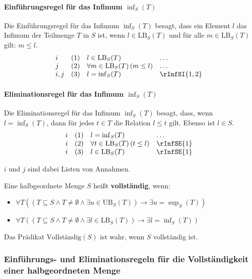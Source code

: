 \documentclass[main.tex]{subfiles}
\begin{document}
\paragraph{Einführungsregel für das Infimum \(\inf_S(T)\)}
Die Einführungsregel für das Infimum \(\inf_S(T)\) besagt, dass ein Element \( l \) das Infimum der Teilmenge \( T \) in \( S \) ist, wenn \( l \in \text{LB}_S(T) \) und für alle \( m \in \text{LB}_S(T) \) gilt: \( m \leq l \).
\[
\begin{array}{llll}
    i   & (1) & l \in \text{LB}_S(T) & \dots \\
    j   & (2) & \forall m \in \text{LB}_S(T) \, (m \leq l) & \dots \\
    i,j & (3) & l = \inf_S(T) & \rInfSI{1,2}
\end{array}
\]

\paragraph{Eliminationsregel für das Infimum \(\inf_S(T)\)}
Die Eliminationsregel für das Infimum \(\inf_S(T)\) besagt, dass, wenn \( l = \inf_S(T) \), dann für jedes \( t \in T \) die Relation \( l \leq t \) gilt. Ebenso ist \( l \in S \).
\[
\begin{array}{llll}
    i & (1) & l = \inf_S(T) & \dots \\
    i & (2) & \forall t \in \text{LB}_S(T) \, (t \leq l) & \rInfSE{1} \\
    i & (3) & l \in \text{LB}_S(T) & \rInfSE{1}
\end{array}
\]

\(i\) und \(j\) sind dabei Listen von Annahmen.

\begin{definition}
    Eine halbgeordnete Menge \( S \) heißt \textbf{vollständig}, wenn:
    \begin{itemize}
        \item \(\forall T((T\subseteq S\land T \neq \emptyset\land \exists u \in \text{UB}_S(T)) \rightarrow \exists u = \sup_S(T))\)
        \item \(\forall T((T\subseteq S\land T \neq \emptyset\land \exists l \in \text{LB}_S(T)) \rightarrow \exists l = \inf_S(T))\)
    \end{itemize}
    Das Prädikat \(\text{Vollständig}(S)\) ist wahr, wenn \( S \) vollständig ist.
\end{definition}

\subsubsection{Einführungs- und Eliminationsregeln für die Vollständigkeit einer halbgeordneten Menge}
\label{rule:rCompleteI} \label{rule:rCompleteE}
\end{document}
